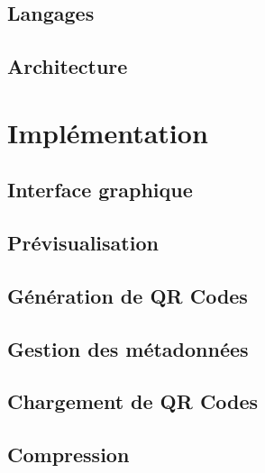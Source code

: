 \documentclass{report}
\begin{document}
		\subsection{Langages}
			 \label{langages}
			
		\subsection{Architecture}		
			 \label{architecture}
				
		
	\section{Implémentation}
		
		\subsection{Interface graphique}
			 \label{interfaceGraphique}
			
		\subsection{Prévisualisation}
			 \label{previsualisation}
			
		\subsection{Génération de QR Codes}
			 \label{generation}
			
		\subsection{Gestion des métadonnées}
			 \label{metadonnees}
			
		\subsection{Chargement de QR Codes}
			 \label{chargement}
			
		\subsection{Compression}
			 \label{compression}
			
\end{document}

